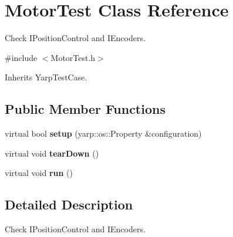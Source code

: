 \section{Motor\+Test Class Reference}
\label{classMotorTest}


Check I\+Position\+Control and I\+Encoders.  




{\ttfamily \#include $<$Motor\+Test.\+h$>$}



Inherits Yarp\+Test\+Case.

\subsection*{Public Member Functions}
\begin{DoxyCompactItemize}
\item 
\label{classMotorTest_a899f7015f4c982fd25b0a2de4d693562} 
virtual bool {\bfseries setup} (yarp\+::os\+::\+Property \&configuration)
\item 
\label{classMotorTest_a35093fc16f2160699a962e2e600d12f7} 
virtual void {\bfseries tear\+Down} ()
\item 
\label{classMotorTest_a7f262c968aa26e60b2d654fa0f3b6d1a} 
virtual void {\bfseries run} ()
\end{DoxyCompactItemize}


\subsection{Detailed Description}
Check I\+Position\+Control and I\+Encoders. 

